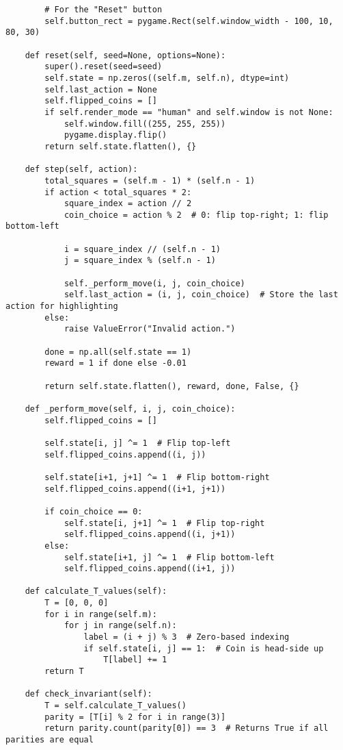 \begin{lstlisting}
        # For the "Reset" button
        self.button_rect = pygame.Rect(self.window_width - 100, 10, 80, 30)

    def reset(self, seed=None, options=None):
        super().reset(seed=seed)
        self.state = np.zeros((self.m, self.n), dtype=int)
        self.last_action = None
        self.flipped_coins = []
        if self.render_mode == "human" and self.window is not None:
            self.window.fill((255, 255, 255))
            pygame.display.flip()
        return self.state.flatten(), {}

    def step(self, action):
        total_squares = (self.m - 1) * (self.n - 1)
        if action < total_squares * 2:
            square_index = action // 2
            coin_choice = action % 2  # 0: flip top-right; 1: flip bottom-left

            i = square_index // (self.n - 1)
            j = square_index % (self.n - 1)

            self._perform_move(i, j, coin_choice)
            self.last_action = (i, j, coin_choice)  # Store the last action for highlighting
        else:
            raise ValueError("Invalid action.")

        done = np.all(self.state == 1)
        reward = 1 if done else -0.01

        return self.state.flatten(), reward, done, False, {}

    def _perform_move(self, i, j, coin_choice):
        self.flipped_coins = []

        self.state[i, j] ^= 1  # Flip top-left
        self.flipped_coins.append((i, j))

        self.state[i+1, j+1] ^= 1  # Flip bottom-right
        self.flipped_coins.append((i+1, j+1))

        if coin_choice == 0:
            self.state[i, j+1] ^= 1  # Flip top-right
            self.flipped_coins.append((i, j+1))
        else:
            self.state[i+1, j] ^= 1  # Flip bottom-left
            self.flipped_coins.append((i+1, j))

    def calculate_T_values(self):
        T = [0, 0, 0]
        for i in range(self.m):
            for j in range(self.n):
                label = (i + j) % 3  # Zero-based indexing
                if self.state[i, j] == 1:  # Coin is head-side up
                    T[label] += 1
        return T

    def check_invariant(self):
        T = self.calculate_T_values()
        parity = [T[i] % 2 for i in range(3)]
        return parity.count(parity[0]) == 3  # Returns True if all parities are equal


\end{lstlisting}
